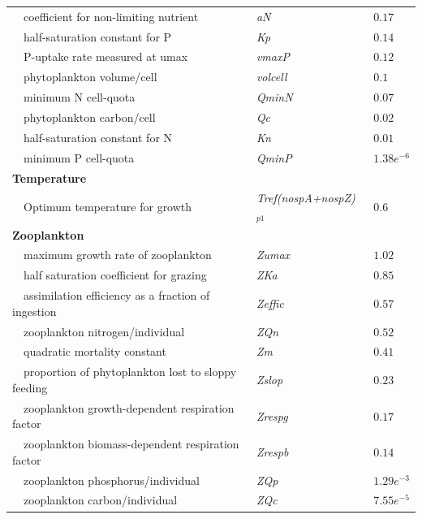 \documentclass[review]{elsarticle}\usepackage[]{graphicx}\usepackage[]{color}
\begin{document}
\begin{table}[!tbp]
{\begin{center}
\begin{tabular}{lll}
~~coefficient for non-limiting nutrient&\textit{aN}&$0.17$\tabularnewline
~~half-saturation constant for P&\textit{Kp}&$0.14$\tabularnewline
~~P-uptake rate measured at umax&\textit{vmaxP}&$0.12$\tabularnewline
~~phytoplankton volume/cell&\textit{volcell}&$0.1$\tabularnewline
~~minimum N cell-quota&\textit{QminN}&$0.07$\tabularnewline
~~phytoplankton carbon/cell&\textit{Qc}&$0.02$\tabularnewline
~~half-saturation constant for N&\textit{Kn}&$0.01$\tabularnewline
~~minimum P cell-quota&\textit{QminP}&$1.38e^{-6}$\tabularnewline
\hline
{\bfseries Temperature}&&\tabularnewline
~~Optimum temperature for growth&\textit{Tref(nospA+nospZ)$_{p1}$}&$0.6$\tabularnewline
\hline
{\bfseries Zooplankton}&&\tabularnewline
~~maximum growth rate of zooplankton&\textit{Zumax}&$1.02$\tabularnewline
~~half saturation coefficient for grazing&\textit{ZKa}&$0.85$\tabularnewline
~~assimilation efficiency as a fraction of ingestion&\textit{Zeffic}&$0.57$\tabularnewline
~~zooplankton nitrogen/individual&\textit{ZQn}&$0.52$\tabularnewline
~~quadratic mortality constant&\textit{Zm}&$0.41$\tabularnewline
~~proportion of phytoplankton lost to sloppy feeding&\textit{Zslop}&$0.23$\tabularnewline
~~zooplankton growth-dependent respiration factor&\textit{Zrespg}&$0.17$\tabularnewline
~~zooplankton biomass-dependent respiration factor&\textit{Zrespb}&$0.14$\tabularnewline
~~zooplankton phosphorus/individual&\textit{ZQp}&$1.29e^{-3}$\tabularnewline
~~zooplankton carbon/individual&\textit{ZQc}&$7.55e^{-5}$\tabularnewline
\hline
\end{tabular}\end{center}}
\end{table}
\end{document}

